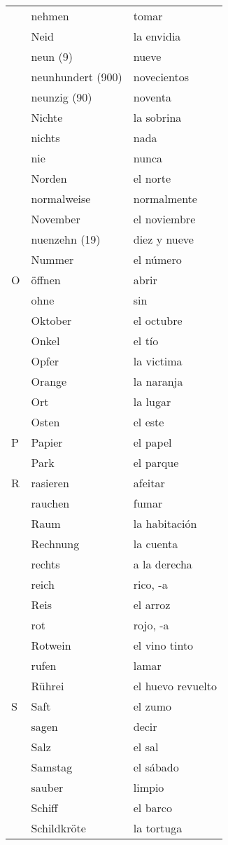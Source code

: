 \documentclass{spanish_summary}
\begin{document}
\begin{longtable}{p{} p{} | p{}}
& nehmen & tomar  \\
& Neid & la envidia \\
& neun (9) & nueve  \\
& neunhundert (900) & novecientos  \\
& neunzig (90) & noventa  \\
& Nichte & la sobrina  \\
& nichts & nada \\
& nie & nunca  \\
& Norden & el norte  \\
& normalweise & normalmente \\
& November & el noviembre  \\
& nuenzehn (19) & diez y nueve  \\
& Nummer & el número  \\
O & öffnen & abrir  \\
& ohne & sin  \\
& Oktober & el octubre  \\
& Onkel & el tío  \\
& Opfer & la victima \\
& Orange & la naranja  \\
& Ort & la lugar  \\
& Osten & el este  \\
P & Papier & el papel  \\
& Park & el parque  \\
R & rasieren & afeitar \\
& rauchen & fumar  \\
& Raum & la habitación  \\
& Rechnung & la cuenta  \\
& rechts & a la derecha \\
& reich & rico, -a  \\
& Reis & el arroz  \\
& rot & rojo, -a  \\
& Rotwein & el vino tinto  \\
& rufen & lamar  \\
& Rührei & el huevo revuelto\\
S & Saft & el zumo  \\
& sagen & decir  \\
& Salz & el sal  \\
& Samstag & el sábado  \\
& sauber & limpio  \\
& Schiff & el barco  \\
& Schildkröte & la tortuga  \\

\end{longtable}
\end{document}

